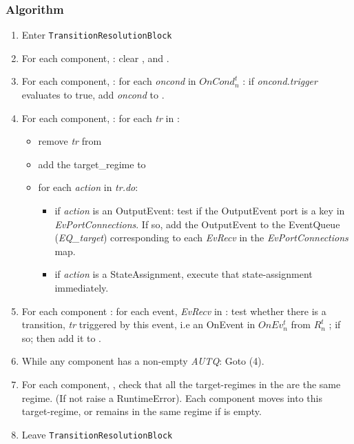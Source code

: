 \documentclass{article}
\begin{document}
\subsubsection{Algorithm}

\begin{enumerate}
\item Enter {\tt TransitionResolutionBlock}
\item For each component, \CN: clear \RCLn, \AUTQn and \EQn.
\item For each component, \CN: for each \textsl{oncond} in $OnCond^{t}_{n}$ : if
\textsl{oncond.trigger} evaluates to true, add \textsl{oncond} to \AUTQn.
\item For each component, \CN:  for each \textsl{tr} in \AUTQn :
\begin{itemize}
\item
remove \textsl{tr} from \AUTQn
\item add the target\_regime to \RCLn
\item for each
\textsl{action} in \textsl{tr.do}:
\begin{itemize}
\item if \textsl{action} is an OutputEvent: test
if the OutputEvent port is a key in \textsl{EvPortConnections}. If so, add the
    OutputEvent to the EventQueue (\textsl{EQ\_{target}}) corresponding to each
    \textsl{EvRecv} in the \textsl{EvPortConnections} map.

\item  if \textsl{action}  is a StateAssignment, execute that state-assignment
immediately.
\end{itemize}
\end{itemize}

\item For each component \CN: for each event, \textsl{EvRecv} in \EQn: test
whether there is a transition, \textsl{tr} triggered by this event, i.e an
OnEvent in $OnEv^t_n$ from $R^t_n$ ; if so; then add it to \AUTQn.

\item While any component has a non-empty \textsl{AUTQ}: Goto (4).

\item For each component, \CN, check that all the target-regimes in the \RCLn
are the same regime. (If not raise a RuntimeError). Each component moves into
this target-regime, or remains in the same regime if \RCLn is empty.

\item Leave {\tt TransitionResolutionBlock}

\end{enumerate}
\end{document}
